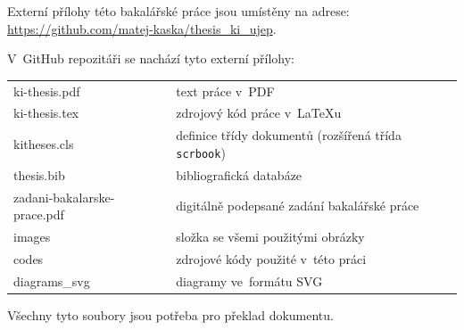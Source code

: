 \documentclass[male,czech,api_bc]{kitheses}
\begin{document}
Externí přílohy této bakalářské práce jsou umístěny na adrese:\\ \url{https://github.com/matej-kaska/thesis_ki_ujep}.

V~GitHub repozitáři se nachází tyto externí přílohy:

\begin{longtable}{ll}
	\hline
	ki-thesis.pdf & text práce v~PDF \\
	ki-thesis.tex & zdrojový kód práce v~\LaTeX{}u \\
	kitheses.cls & definice třídy dokumentů (rozšířená třída \texttt{scrbook})\\
	thesis.bib & bibliografická databáze \\
	zadani-bakalarske-prace.pdf & digitálně podepsané zadání bakalářské práce\\
	images & složka se všemi použitými obrázky \\
	codes & zdrojové kódy použité v~této práci \\
	diagrams\_svg & diagramy ve~formátu SVG \\
	\hline
\end{longtable}

Všechny tyto soubory jsou potřeba pro překlad dokumentu.
\end{document}
